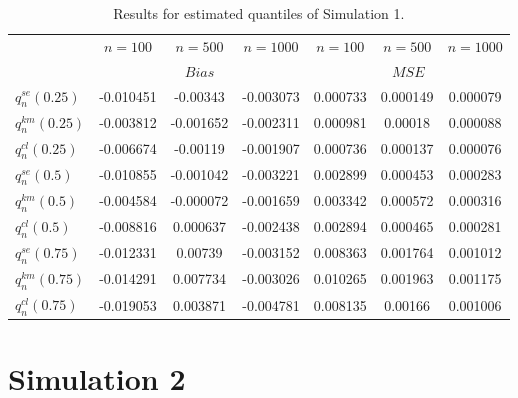 \begin{table}[h!]
	\begin{center}
		\begin{tabular}{| l || c | c | c || c | c | c |}
			\hline
			&       $n=100$   &    $n=500$    &    $n=1000$ &       $n=100$   &    $n=500$    &    $n=1000$\\
			\cline{2-7}
			& \multicolumn{3}{c||}{$Bias$} &\multicolumn{3}{c|}{$MSE$}\\
			\hline
			\hline
			$q^{se}_n(0.25) $  & -0.010451 & -0.00343 & -0.003073  & 0.000733 & 0.000149 & 0.000079\\
			$q^{km}_n(0.25) $  & -0.003812 & -0.001652 & -0.002311  & 0.000981 & 0.00018 & 0.000088\\
			$q^{cl}_n(0.25) $  & -0.006674 & -0.00119 & -0.001907  & 0.000736 & 0.000137 & 0.000076\\
			\hline
			$q^{se}_n(0.5) $  & -0.010855 & -0.001042 & -0.003221  & 0.002899 & 0.000453 & 0.000283\\
			$q^{km}_n(0.5)$  & -0.004584 & -0.000072 & -0.001659  & 0.003342 & 0.000572 & 0.000316\\
			$q^{cl}_n(0.5)$  & -0.008816 & 0.000637 & -0.002438  & 0.002894 & 0.000465 & 0.000281\\
			\hline
			$q^{se}_n(0.75)$  & -0.012331 & 0.00739 & -0.003152  & 0.008363 & 0.001764 & 0.001012\\
			$q^{km}_n(0.75)$  & -0.014291 & 0.007734 & -0.003026  & 0.010265 & 0.001963 & 0.001175\\
			$q^{cl}_n(0.75)$  & -0.019053 & 0.003871 & -0.004781  & 0.008135 & 0.00166 & 0.001006\\
			\hline
		\end{tabular}
	\end{center}
	\caption{Results for estimated quantiles of Simulation 1.}
	\label{tab:res_expexp2}
\end{table}
%
%
%
%
\section{Simulation 2} \label{sec:sim_weiwei}

